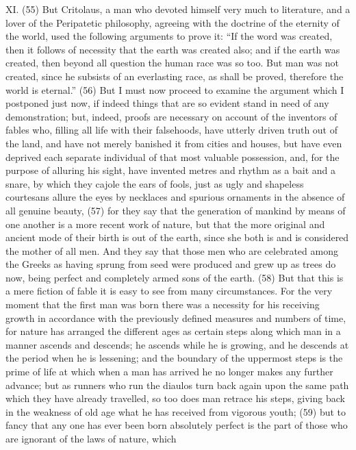 XI. (55) But Critolaus, a man who devoted himself very much to literature, and a lover of the
Peripatetic philosophy, agreeing with the doctrine of the eternity of the world, used the following
arguments to prove it: ``If the word was created, then it follows of necessity that the earth was
created also; and if the earth was created, then beyond all question the human race was so too.
But man was not created, since he subsists of an everlasting race, as shall be proved, therefore
the world is eternal.'' (56) But I must now proceed to examine the argument which I postponed just
now, if indeed things that are so evident stand in need of any demonstration; but, indeed, proofs
are necessary on account of the inventors of fables who, filling all life with their falsehoods, have
utterly driven truth out of the land, and have not merely banished it from cities and houses, but have
even deprived each separate individual of that most valuable possession, and, for the purpose of
alluring his sight, have invented metres and rhythm as a bait and a snare, by which they cajole the
ears of fools, just as ugly and shapeless courtesans allure the eyes by necklaces and spurious
ornaments in the absence of all genuine beauty, (57) for they say that the generation of mankind
by means of one another is a more recent work of nature, but that the more original and ancient
mode of their birth is out of the earth, since she both is and is considered the mother of all men.
And they say that those men who are celebrated among the Greeks as having sprung from seed
were produced and grew up as trees do now, being perfect and completely armed sons of the
earth. (58) But that this is a mere fiction of fable it is easy to see from many circumstances. For
the very moment that the first man was born there was a necessity for his receiving growth in
accordance with the previously defined measures and numbers of time, for nature has arranged
the different ages as certain steps along which man in a manner ascends and descends; he
ascends while he is growing, and he descends at the period when he is lessening; and the
boundary of the uppermost steps is the prime of life at which when a man has arrived he no longer
makes any further advance; but as runners who run the diaulos turn back again upon the same
path which they have already travelled, so too does man retrace his steps, giving back in the
weakness of old age what he has received from vigorous youth; (59) but to fancy that any one has
ever been born absolutely perfect is the part of those who are ignorant of the laws of nature, which
